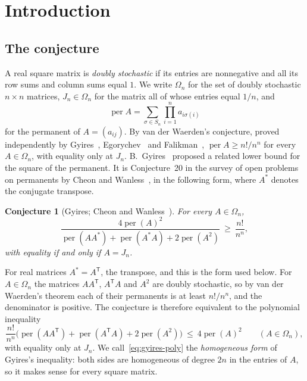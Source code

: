 \documentclass[11pt,a4paper]{article}
\newtheorem{conjecture}[theorem]{Conjecture}
\theoremstyle{definition}
\theoremstyle{remark}
\newcommand{\per}{\operatorname{per}}
\newcommand{\T}{\mathsf{T}}
\begin{document}
\section{Introduction}

\subsection{The conjecture}\label{sec:conjecture}
A real square matrix is \emph{doubly stochastic} if its entries are nonnegative and all its row sums and column sums
equal $1$. We write $\Omega_n$ for the set of doubly stochastic $n\times n$ matrices, $J_n\in\Omega_n$ for the matrix
all of whose entries equal $1/n$, and
\[
\per A=\sum_{\sigma\in S_n}\prod_{i=1}^n a_{i\sigma(i)}
\]
for the permanent of $A=(a_{ij})$. By van der Waerden's conjecture, proved independently by Gyires~\cite{gyires80},
Egorychev~\cite{egorychev} and Falikman~\cite{falikman}, $\per A\ge n!/n^n$ for every $A\in\Omega_n$, with equality
only at $J_n$. B.~Gyires~\cite{gyires} proposed a related lower bound for the square of the permanent. It is
Conjecture~20 in the survey of open problems on permanents by Cheon and Wanless~\cite{cw}, in the following form, where
$A^*$ denotes the conjugate transpose.

\begin{conjecture}[Gyires; Cheon and Wanless~{\cite[Conjecture~20]{cw}}]\label{conj:gyires}
For every $A\in\Omega_n$,
\[
\frac{4\per(A)^2}{\per(AA^*)+\per(A^*A)+2\per(A^2)}\ \ge\ \frac{n!}{n^n},
\]
with equality if and only if $A=J_n$.
\end{conjecture}

For real matrices $A^*=A^\T$, the transpose, and this is the form used below. For $A\in\Omega_n$ the matrices
$AA^\T$, $A^\T A$ and $A^2$ are doubly stochastic, so by van der Waerden's theorem each of their permanents is at
least $n!/n^n$, and the denominator is positive. The conjecture is therefore equivalent to the polynomial inequality
\begin{equation}\label{eq:gyires-poly}
\frac{n!}{n^n}\bigl(\per(AA^\T)+\per(A^\T A)+2\per(A^2)\bigr)\ \le\ 4\per(A)^2\qquad(A\in\Omega_n),
\end{equation}
with equality only at $J_n$. We call~\eqref{eq:gyires-poly} the \emph{homogeneous form} of Gyires's inequality: both
sides are homogeneous of degree $2n$ in the entries of $A$, so it makes sense for every square matrix.
\end{document}
